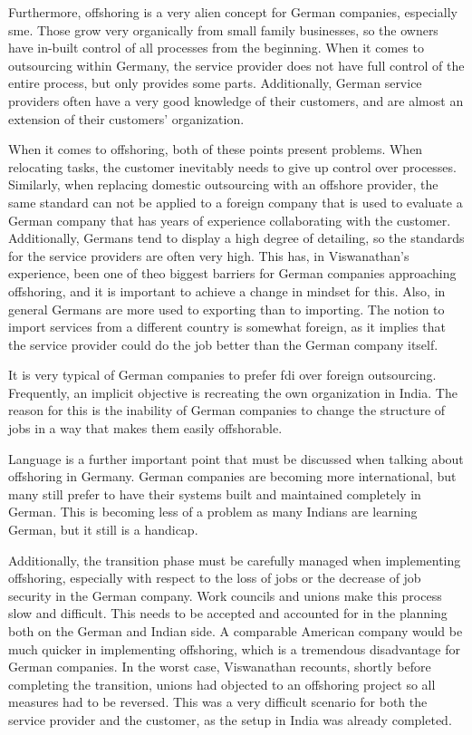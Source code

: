 Furthermore, offshoring is a very alien concept for German companies, especially \gls{sme}. Those grow very organically from small family businesses, so the owners have in-built control of all processes from the beginning. When it comes to outsourcing within Germany, the service provider does not have full control of the entire process, but only provides some parts. Additionally, German service providers often have a very good knowledge of their customers, and are almost an extension of their customers' organization. 

When it comes to offshoring, both of these points present problems. When relocating tasks, the customer inevitably needs to give up control over processes. Similarly, when replacing domestic outsourcing with an offshore provider, the same standard can not be applied to a foreign company that is used to evaluate a German company that has years of experience collaborating with the customer. Additionally, Germans tend to display a high degree of detailing, so the standards for the service providers are often very high. This has, in Viswanathan's experience, been one of theo biggest barriers for German companies approaching offshoring, and it is important to achieve a change in mindset for this. Also, in general Germans are more used to exporting than to importing. The notion to import services from a different country is somewhat foreign, as it implies that the service provider could do the job better than the German company itself.

It is very typical of German companies to prefer \gls{fdi} over foreign outsourcing. Frequently, an implicit objective is recreating the own organization in India. The reason for this is the inability of German companies to change the structure of jobs in a way that makes them easily offshorable.

Language is a further important point that must be discussed when talking about offshoring in Germany. German companies are becoming more international, but many still prefer to have their systems built and maintained completely in German. This is becoming less of a problem as many Indians are learning German, but it still is a handicap.

Additionally, the transition phase must be carefully managed when implementing offshoring, especially with respect to the loss of jobs or the decrease of job security in the German company. Work councils and unions make this process slow and difficult. This needs to be accepted and accounted for in the planning both on the German and Indian side. A comparable American company would be much quicker in implementing offshoring, which is a tremendous disadvantage for German companies. In the worst case, Viswanathan recounts, shortly before completing the transition, unions had objected to an offshoring project so all measures had to be reversed. This was a very difficult scenario for both the service provider and the customer, as the setup in India was already completed.

